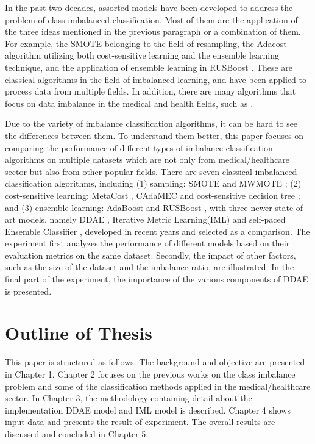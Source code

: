 In the past two decades, assorted models have been developed to address the problem of class imbalanced classification. Most of them are the application of the three ideas mentioned in the previous paragraph or a combination of them. For example, the SMOTE \cite{13}  belonging to the field of resampling, the Adacost \cite{94} algorithm utilizing both cost-sensitive learning and the ensemble learning technique, and the application of ensemble learning in RUSBoost \cite{64}. These are classical algorithms in the field of imbalanced learning, and have been applied to process data from multiple fields. In addition, there are many algorithms that focus on data imbalance in the medical and health fields, such as \cite{3,5,8}.

Due to the variety of imbalance classification algorithms, it can be hard to see the differences between them. To understand them better, this paper focuses on comparing the performance of different types of imbalance classification algorithms on multiple datasets which are not only from medical/healthcare sector but also from other popular fields. There are seven classical imbalanced classification algorithms, including (1) sampling: SMOTE \cite{13} and MWMOTE \cite{62}; (2) cost-sensitive learning: MetaCost \cite{23}, CAdaMEC \cite{67} and cost-sensitive decision tree \cite{10}; and (3) ensemble learning: AdaBoost \cite{63} and RUSBoost \cite{64}, with three newer state-of-art models, namely DDAE \cite{73}, Iterative Metric Learning(IML) \cite{72} and self-paced Ensemble Classifier \cite{96}, developed in recent years and selected as a comparison. The experiment first analyzes the performance of different models based on their evaluation metrics on the same dataset. Secondly, the impact of other factors, such as the size of the dataset and the imbalance ratio, are illustrated. In the final part of the experiment, the importance of the various components of DDAE is presented.

\section{Outline of Thesis}
This paper is structured as follows. The background and objective are presented in Chapter 1. Chapter 2 focuses on the previous works on the class imbalance problem and some of the classification methods applied in the medical/healthcare sector. In Chapter 3, the methodology containing detail about the implementation DDAE model and IML model is described. Chapter 4 shows input data and presents the result of experiment. The overall results are discussed and concluded in Chapter 5.




